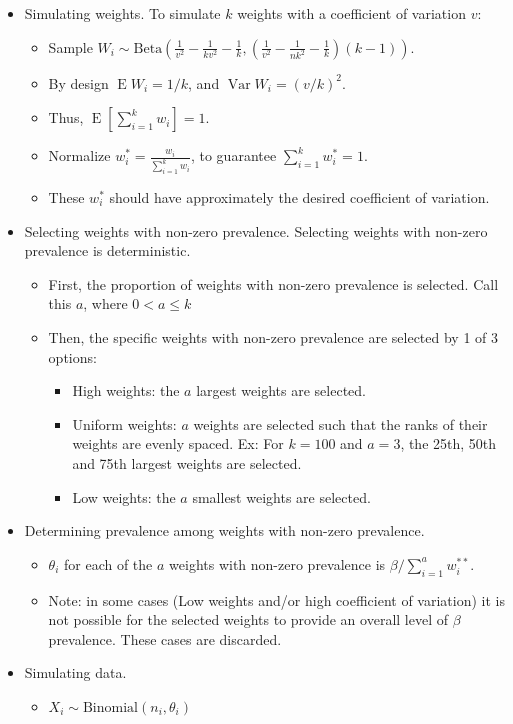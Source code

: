 \documentclass{article}
\DeclareMathOperator{\E}{E}
\DeclareMathOperator{\Var}{Var}
\begin{document}
\begin{itemize}
    \item Simulating weights. To simulate \( k \) weights with a coefficient of variation \( v \):
    \begin{itemize}
        \item Sample \( W_i \sim \text{Beta}\left( \frac{1}{v^2} - \frac{1}{kv^2} - \frac{1}{k}, \left( \frac{1}{v^2} - \frac{1}{nk^2} - \frac{1}{k} \right)  (k - 1) \right)\).
        \item By design \( \E W_i = 1 / k \), and  \( \Var W_i = ( v / k )^2  \).
        \item Thus, \( \E \left[ \sum_{i=1}^k w_i \right] = 1\).
        \item Normalize \( w_i^* = \frac{w_i}{\sum_{i=1}^k w_i} \), to guarantee \( \sum_{i=1}^k w_i^* = 1 \).
        \item These \( w_i^* \) should have approximately the desired coefficient of variation.
    \end{itemize}
    \item Selecting weights with non-zero prevalence. Selecting weights with non-zero prevalence is deterministic. 
    \begin{itemize}
        \item First, the proportion of weights with non-zero prevalence is selected. Call this \( a \), where \( 0 < a \leq k \)
        \item Then, the specific weights with non-zero prevalence are selected by 1 of 3 options:
        \begin{itemize}
            \item High weights: the  \( a \) largest weights are selected.
            \item Uniform weights: \( a \) weights are selected such that the ranks of their weights are evenly spaced. Ex: For \( k = 100 \) and \( a = 3 \), the 25th, 50th and 75th largest weights are selected.
            \item Low weights: the  \( a \) smallest weights are selected.
        \end{itemize}
    \end{itemize}
    \item Determining prevalence among weights with non-zero prevalence.
    \begin{itemize}
        \item \( \theta_i \)  for each of the \( a \) weights with non-zero prevalence is \( \beta / \sum_{i=1}^a w_i^{**} \).
        \item Note: in some cases (Low weights and/or high coefficient of variation) it is not possible for the selected weights to provide an overall level of \( \beta \) prevalence. These cases are discarded.
    \end{itemize}
    \item Simulating data.
    \begin{itemize}
        \item \( X_i \sim \text{Binomial}(n_i, \theta_i) \)
    \end{itemize}
\end{itemize}
\end{document}
